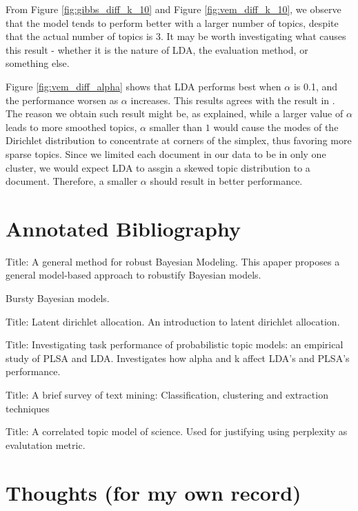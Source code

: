 \documentclass{article}
\begin{document}
From Figure \ref{fig:gibbs_diff_k_10} and Figure \ref{fig:vem_diff_k_10}, we observe that the model tends to perform better with a larger number of topics, despite that the actual number of topics is 3. It may be worth investigating what causes this result - whether it is the nature of LDA, the evaluation method, or something else.

Figure \ref{fig:vem_diff_alpha} shows that LDA performs best when $\alpha$ is 0.1, and the performance worsen as $\alpha$ increases. This results agrees with the result in \cite{lu2011investigating}. The reason we obtain such result might be, as \cite{lu2011investigating} explained, while a larger value of $\alpha$ leads to more smoothed topics, $\alpha$ smaller than $1$ would cause the modes of the Dirichlet distribution to concentrate at corners of the simplex, thus favoring more sparse topics. Since we limited each document in our data to be in only one cluster, we would expect LDA to assgin a skewed topic distribution to a document. Therefore, a smaller $\alpha$ should result in better performance.







\section{Annotated Bibliography}
\cite{wang2018general}
Title: A general method for robust Bayesian Modeling.
This apaper proposes a general model-based approach to robustify Bayesian models.

\cite{doyle2009accounting}
Bursty Bayesian models.

\cite{blei2003latent}
Title: Latent dirichlet allocation.
An introduction to latent dirichlet allocation.

\cite{lu2011investigating}
Title: Investigating task performance of probabilistic topic models: an empirical study of PLSA and LDA. Investigates how alpha and k affect LDA's and PLSA's performance.

\cite{allahyari2017brief}
Title: A brief survey of text mining: Classification, clustering and extraction techniques

\cite{blei2007correlated}
Title: A correlated topic model of science. Used for justifying using perplexity as evalutation metric.


\section{Thoughts (for my own record)}
\end{document}
